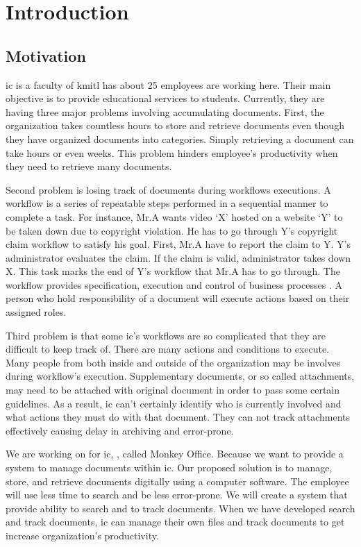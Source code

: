 \chapter{Introduction}

\section{Motivation}
\label{sec:motivation}
\gls{ic} is a faculty of \gls{kmitl} has about 25 employees are working here.
Their main objective is to provide educational services to students. 
Currently, they are having three major problems involving accumulating documents.
First, the organization takes countless hours to store and retrieve documents even though they have organized documents into categories.
Simply retrieving a document can take hours or even weeks. 
This problem hinders employee's productivity when they need to retrieve many documents. 

Second problem is losing track of documents during workflows executions. 
A workflow is a series of repeatable steps performed in a sequential manner to complete a task.
For instance, Mr.A wants video \enquote*{X} hosted on a website \enquote*{Y} to be taken down due to copyright violation.
He has to go through Y's copyright claim workflow to satisfy his goal.
First, Mr.A have to report the claim to Y.
Y's administrator evaluates the claim.
If the claim is valid, administrator takes down X.
This task marks the end of Y's workflow that Mr.A has to go through.
The workflow provides specification, execution and control of business processes \cite{Jablonski:1996:WMM}. 
A person who hold responsibility of a document will execute actions based on their assigned roles.

Third problem is that some \gls{ic}'s workflows are so complicated that they are difficult to keep track of.
There are many actions and conditions to execute.
Many people from both inside and outside of the organization may be involves during workflow's execution.
Supplementary documents, or so called attachments, may need to be attached with original document in order to pass some certain guidelines.
As a result, \gls{ic} can't certainly identify who is currently involved and what actions they must do with that document.
They can not track attachments effectively causing delay in archiving and error-prone.

We are working on \MakeLowercase{\projTitle} for \gls{ic}, \kmitl, called Monkey Office. Because we want to provide a system to manage documents within \gls{ic}. Our proposed solution is to manage, store, and retrieve documents digitally using a computer software.
The employee will use less time to search and be less error-prone.
We will create a system that provide ability to search and to track documents.
When we have developed search and track documents, \gls{ic} can manage their own files and track documents to get increase organization's productivity. 

